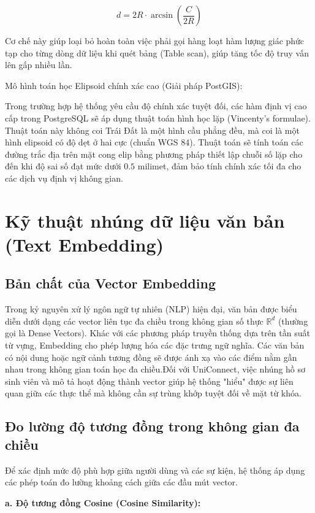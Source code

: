$$d = 2R \cdot \arcsin\left(\frac{C}{2R}\right)$$

Cơ chế này giúp loại bỏ hoàn toàn việc phải gọi hàng loạt hàm lượng giác phức tạp cho từng dòng dữ liệu khi quét bảng (Table scan), giúp tăng tốc độ truy vấn lên gấp nhiều lần.

Mô hình toán học Elipsoid chính xác cao (Giải pháp PostGIS):

Trong trường hợp hệ thống yêu cầu độ chính xác tuyệt đối, các hàm định vị cao cấp trong PostgreSQL sẽ áp dụng thuật toán hình học lặp (Vincenty's formulae)\cite{vincenty1975direct}. Thuật toán này không coi Trái Đất là một hình cầu phẳng đều, mà coi là một hình elipsoid có độ dẹt ở hai cực (chuẩn WGS 84). Thuật toán sẽ tính toán các đường trắc địa trên mặt cong elip bằng phương pháp thiết lập chuỗi số lặp cho đến khi độ sai số đạt mức dưới $0.5$ milimet, đảm bảo tính chính xác tối đa cho các dịch vụ định vị không gian.

\section{Kỹ thuật nhúng dữ liệu văn bản (Text Embedding)}
\subsection{Bản chất của Vector Embedding}

Trong kỷ nguyên xử lý ngôn ngữ tự nhiên (NLP) hiện đại, văn bản được biểu diễn dưới dạng các vector liên tục đa chiều trong không gian số thực $\mathbb{R}^d$ (thường gọi là Dense Vectors). Khác với các phương pháp truyền thống dựa trên tần suất từ vựng, Embedding cho phép lượng hóa các đặc trưng ngữ nghĩa. Các văn bản có nội dung hoặc ngữ cảnh tương đồng sẽ được ánh xạ vào các điểm nằm gần nhau trong không gian toán học đa chiều.Đối với UniConnect, việc nhúng hồ sơ sinh viên và mô tả hoạt động thành vector giúp hệ thống "hiểu" được sự liên quan giữa các thực thể mà không cần sự trùng khớp tuyệt đối về mặt từ khóa.

\subsection{Đo lường độ tương đồng trong không gian đa chiều}

Để xác định mức độ phù hợp giữa người dùng và các sự kiện, hệ thống áp dụng các phép toán đo lường khoảng cách giữa các đầu mút vector\cite{cha2007comprehensive}.

\textbf{a. Độ tương đồng Cosine (Cosine Similarity):}

